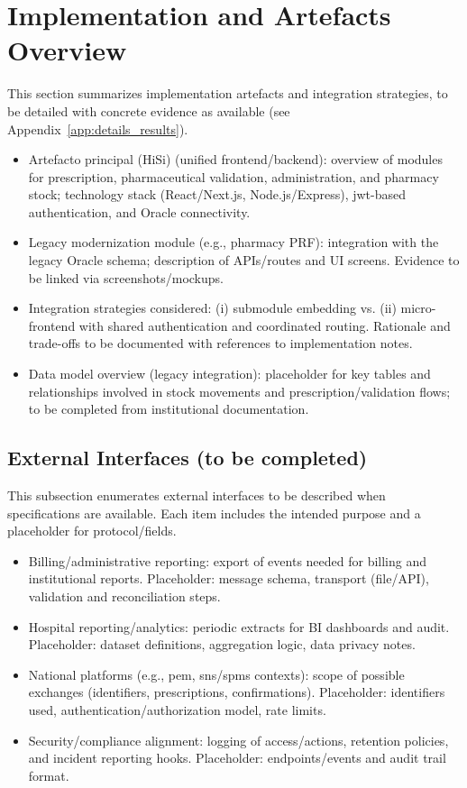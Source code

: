 \section{Implementation and Artefacts Overview}
This section summarizes implementation artefacts and integration strategies, to be detailed with concrete evidence as available (see Appendix~\ref{app:details_results}).
\begin{itemize}
    \item Artefacto principal (HiSi) (unified frontend/backend): overview of modules for prescription, pharmaceutical validation, administration, and pharmacy stock; technology stack (React/Next.js, Node.js/Express), \gls{jwt}-based authentication, and Oracle connectivity.
    \item Legacy modernization module (e.g., pharmacy PRF): integration with the legacy Oracle schema; description of APIs/routes and UI screens. Evidence to be linked via screenshots/mockups.
    \item Integration strategies considered: (i) submodule embedding vs. (ii) micro-frontend with shared authentication and coordinated routing. Rationale and trade-offs to be documented with references to implementation notes.
    \item Data model overview (legacy integration): placeholder for key tables and relationships involved in stock movements and prescription/validation flows; to be completed from institutional documentation.
\end{itemize}

\subsection*{External Interfaces (to be completed)}
This subsection enumerates external interfaces to be described when specifications are available. Each item includes the intended purpose and a placeholder for protocol/fields.
\begin{itemize}
    \item Billing/administrative reporting: export of events needed for billing and institutional reports. Placeholder: message schema, transport (file/API), validation and reconciliation steps.
    \item Hospital reporting/analytics: periodic extracts for BI dashboards and audit. Placeholder: dataset definitions, aggregation logic, data privacy notes.
    \item National platforms (e.g., \gls{pem}, \gls{sns}/\gls{spms} contexts): scope of possible exchanges (identifiers, prescriptions, confirmations). Placeholder: identifiers used, authentication/authorization model, rate limits.
    \item Security/compliance alignment: logging of access/actions, retention policies, and incident reporting hooks. Placeholder: endpoints/events and audit trail format.
\end{itemize}


